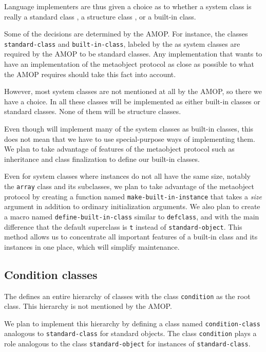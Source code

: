 Language implementers are thus given a choice as to whether a system
class is really a standard class
, a structure class 
, or a built-in class.  

Some of the decisions are determined by the AMOP.  For instance, the
classes \texttt{standard-class} and \texttt{built-in-class}, labeled
by the \hs{} as system classes are required by the AMOP to be
standard classes.  Any implementation that wants to have an
implementation of the metaobject protocol as close as possible to what
the AMOP requires should take this fact into account. 

However, most system classes are not mentioned at all by the AMOP, so
there we have a choice.  In \sysname{} all these classes will be
implemented as either built-in classes or standard classes.  None of
them will be structure classes. 

Even though \sysname{} will implement many of the system classes as
built-in classes, this does not mean that we have to use
special-purpose ways of implementing them.  We plan to take advantage
of features of the metaobject protocol such as inheritance and class
finalization to define our built-in classes.  

Even for system classes where instances do not all have the same size,
notably the \texttt{array} class and its subclasses, we plan to take
advantage of the metaobject protocol by creating a function named
\texttt{make-built-in-instance} that takes a \emph{size} argument in
addition to ordinary initialization arguments.  We also plan to create
a macro named \texttt{define-built-in-class} similar to
\texttt{defclass}, and with the main difference that the default
superclass is \texttt{t} instead of \texttt{standard-object}.  This
method allows us to concentrate all important features of a built-in
class and its instances in one place, which will simplify
maintenance. 

\subsection{Condition classes}
\label{object-system-condition-classes}

The \hs{} defines an entire hierarchy of classes with the class
\texttt{condition} as the root class.  This hierarchy is not mentioned
by the AMOP.  

We plan to implement this hierarchy by defining a class named
\texttt{condition-class} analogous to \texttt{standard-class} for
standard objects.  The class \texttt{condition} plays a role analogous
to the class \texttt{standard-object} for instances of
\texttt{standard-class}. 


